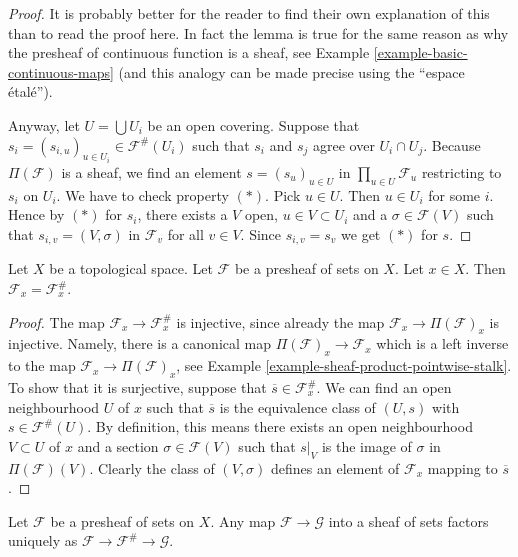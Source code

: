 \begin{proof}
It is probably better for the reader to find their own explanation
of this than to read the proof here. In fact the lemma is true
for the same reason as why the presheaf of continuous
function is a sheaf, see Example \ref{example-basic-continuous-maps}
(and this analogy can be made precise using the ``espace \'etal\'e'').

\medskip\noindent
Anyway, let $U = \bigcup U_i$ be an open covering.
Suppose that $s_i = (s_{i, u})_{u \in U_i} \in \mathcal{F}^{\#}(U_i)$
such that $s_i$ and $s_j$ agree over $U_i \cap U_j$.
Because $\Pi(\mathcal{F})$ is a sheaf,
we find an element $s = (s_u)_{u\in U}$ in $\prod_{u\in U} \mathcal{F}_u$
restricting to $s_i$ on $U_i$. We have to check property $(*)$.
Pick $u \in U$. Then $u \in U_i$ for some $i$. Hence by $(*)$ for $s_i$,
there exists a $V$ open, $u \in V \subset U_i$
and a $\sigma \in \mathcal{F}(V)$
such that $s_{i, v} = (V, \sigma)$ in $\mathcal{F}_v$
for all $v \in V$. Since $s_{i, v} = s_v$ we get $(*)$ for $s$.
\end{proof}

\begin{lemma}
\label{lemma-stalk-sheafification}
Let $X$ be a topological space.
Let $\mathcal{F}$ be a presheaf of sets on $X$.
Let $x \in X$. Then $\mathcal{F}_x = \mathcal{F}^\#_x$.
\end{lemma}

\begin{proof}
The map $\mathcal{F}_x \to \mathcal{F}^\#_x$
is injective, since already the map
$\mathcal{F}_x \to \Pi(\mathcal{F})_x$ is injective.
Namely, there is a canonical map $\Pi(\mathcal{F})_x \to \mathcal{F}_x$
which is a left inverse to the map $\mathcal{F}_x \to \Pi(\mathcal{F})_x$,
see Example \ref{example-sheaf-product-pointwise-stalk}.
To show that it is surjective, suppose that
$\overline{s} \in \mathcal{F}^\#_x$.
We can find an open neighbourhood $U$ of $x$ such that
$\overline{s}$ is the equivalence class of $(U, s)$
with $s \in \mathcal{F}^\#(U)$.
By definition, this means there exists an open neighbourhood
$V \subset U$ of $x$ and a section $\sigma \in \mathcal{F}(V)$
such that $s|_V$ is the image of $\sigma$ in $\Pi(\mathcal{F})(V)$.
Clearly the class of $(V, \sigma)$ defines an element of
$\mathcal{F}_x$ mapping to $\overline{s}$.
\end{proof}

\begin{lemma}
\label{lemma-sheafify-universal}
Let $\mathcal{F}$ be a presheaf of sets on $X$.
Any map $\mathcal{F} \to \mathcal{G}$ into a sheaf of sets
factors uniquely as
$\mathcal{F} \to \mathcal{F}^\# \to \mathcal{G}$.
\end{lemma}

